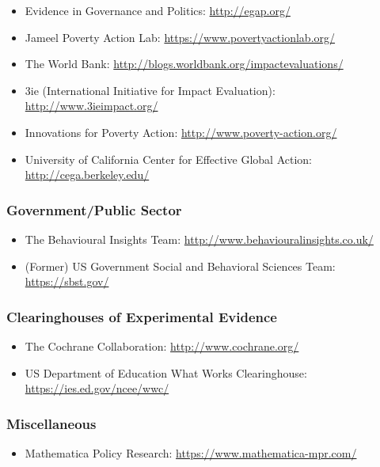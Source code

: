 \documentclass[12pt,a4paper]{article}
\begin{document}
\begin{itemize}

\item Evidence in Governance and Politics: \url{http://egap.org/}
\item Jameel Poverty Action Lab: \url{https://www.povertyactionlab.org/}
\item The World Bank: \url{http://blogs.worldbank.org/impactevaluations/}
\item 3ie (International Initiative for Impact Evaluation): \url{http://www.3ieimpact.org/}
\item Innovations for Poverty Action: \url{http://www.poverty-action.org/}
\item University of California Center for Effective Global Action: \url{http://cega.berkeley.edu/}

\end{itemize}

\subsubsection*{Government/Public Sector}

\begin{itemize}
\item The Behavioural Insights Team: \url{http://www.behaviouralinsights.co.uk/}
\item (Former) US Government Social and Behavioral Sciences Team: \url{https://sbst.gov/}

\end{itemize}

\subsubsection*{Clearinghouses of Experimental Evidence}

\begin{itemize}
\item The Cochrane Collaboration: \url{http://www.cochrane.org/}
\item US Department of Education What Works Clearinghouse: \url{https://ies.ed.gov/ncee/wwc/}

\end{itemize}

\subsubsection*{Miscellaneous}

\begin{itemize}

\item Mathematica Policy Research: \url{https://www.mathematica-mpr.com/}

\end{itemize}
\end{document}
